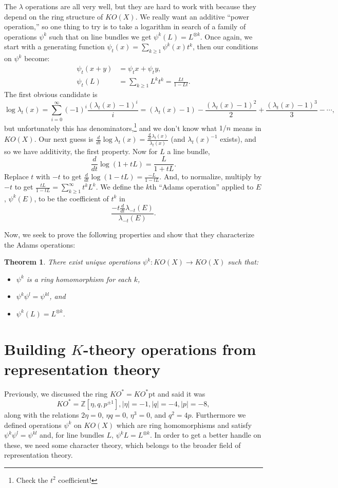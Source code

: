 \documentclass{article}
\newcommand{\OutputBuildingKtheoryOperatorsFromRepresentationTheory}{}
\newcommand{\Z}{\mathbb{Z}}
\newcommand{\ptspace}{\mathrm{pt}}
\newtheorem{thm}{Theorem}[section]
\begin{document}
The $\lambda$ operations are all very well, but they are hard to work with because they depend on the ring structure of $KO(X)$.  We really want an additive ``power operation,'' so one thing to try is to take a logarithm in search of a family of operations $\psi^k$ such that on line bundles we get $\psi^k(L) = L^{\otimes k}$.  Once again, we start with a generating function $\psi_t(x) = \sum_{k \ge 1} \psi^k(x) t^k$, then our conditions on $\psi^k$ become:
\begin{align*}
\psi_t(x + y) & = \psi_t x + \psi_t y, \\
\psi_t(L) & = \sum_{k \ge 1} L^k t^k = \frac{Lt}{1 - Lt}.
\end{align*}
The first obvious candidate is \[\log \lambda_t(x) = \sum_{i=0}^\infty (-1)^i \frac{(\lambda_t(x) - 1)^i}{i} = (\lambda_t(x) - 1) - \frac{(\lambda_t(x) - 1)^2}{2} + \frac{(\lambda_t(x) - 1)^3}{3} - \cdots,\] but unfortunately this has denominators,\footnote{Check the $t^2$ coefficient!} and we don't know what $1/n$ means in $KO(X)$.  Our next guess is $\frac{d}{dt} \log \lambda_t(x) = \frac{\frac{d}{dt} \lambda_t(x)}{\lambda_t(x)}$ (and $\lambda_t(x)^{-1}$ exists), and so we have additivity, the first property.  Now for $L$ a line bundle,
\[
\frac{d}{dt} \log (1 + tL) = \frac{L}{1 + tL}
.\]
Replace $t$ with $-t$ to get $\frac{d}{dt} \log(1 - tL) = \frac{-L}{1 - tL}$.  And, to normalize, multiply by $-t$ to get $\frac{tL}{1 - tL} = \sum_{k \ge 1}^\infty t^k L^k$.  We define the $k$th ``Adams operation'' applied to $E$, $\psi^k(E)$, to be the coefficient of $t^k$ in \[\frac{-t \frac{d}{dt} \lambda_{-t}(E)}{\lambda_{-t}(E)}.\]

Now, we seek to prove the following properties and show that they characterize the Adams operations:
\begin{thm}
There exist unique operations $\psi^k: KO(X) \to KO(X)$ such that:
\begin{itemize}
\item $\psi^k$ is a ring homomorphism for each $k$,
\item $\psi^k \psi^l = \psi^{kl}$, and
\item $\psi^k(L) = L^{\otimes k}$.
\end{itemize}
\end{thm}

\fi
\section{Building $K$-theory operations from representation theory} %
\ifx\OutputBuildingKtheoryOperatorsFromRepresentationTheory\undefined\else
Previously, we discussed the ring $KO^* = KO^* \ptspace$ and said it was
\[
KO^* = \Z[\eta, q, p^{\pm 1}], |\eta| = -1, |q| = -4, |p| = -8
,\]
along with the relations $2 \eta = 0$, $\eta q = 0$, $\eta^3 = 0$, and $q^2 = 4p$.  Furthermore we defined operations $\psi^k$ on $KO(X)$ which are ring homomorphisms and satisfy $\psi^k \psi^l = \psi^{kl}$ and, for line bundles $L$, $\psi^k L = L^{\otimes k}$.  In order to get a better handle on these, we need some character theory, which belongs to the broader field of representation theory.
\end{document}

